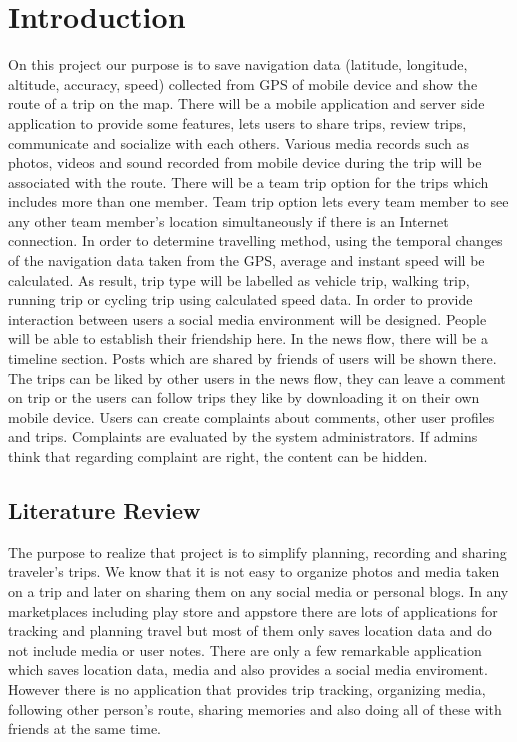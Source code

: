 \chapter{Introduction}
On this project our purpose is to save navigation data (latitude, longitude, altitude, accuracy, speed) collected from GPS of mobile device and show the route of a trip on the map. There will be a mobile application and server side application to provide some features, lets users to share trips, review trips, communicate and socialize with each others. Various media records such as photos, videos and sound recorded from mobile device during the trip will be associated with the route. There will be a team trip option for the trips which includes more than one member. Team trip option lets every team member to see any other team member's location simultaneously if there is an Internet connection. In order to determine travelling method, using the temporal changes of the navigation data taken from the GPS, average and instant speed will be calculated. As result, trip type will be labelled as vehicle trip, walking trip, running trip or cycling trip using calculated speed data. In order to provide interaction between users a social media environment will be designed. People will be able to establish their friendship here. In the news flow, there will be a timeline section. Posts which are shared by friends of users will be shown there. The trips can be liked by other users in the news flow, they can leave a comment on trip or the users can follow trips they like by downloading it on their own mobile device. Users can create complaints about comments, other user profiles and trips. Complaints are evaluated by the system administrators. If admins think that regarding complaint are right, the content can be hidden.
\section{Literature Review}
The purpose to realize that project is to simplify planning, recording and sharing traveler's trips. We know that it is not easy to organize photos and media taken on a trip and later on sharing them on any social media or personal blogs. In any marketplaces including play store and appstore there are lots of applications for tracking and planning travel but most of them only saves location data and do not include media or user notes. There are only a few remarkable application which saves location data, media and also provides a social media enviroment. However there is no application that provides trip tracking, organizing media, following other person's route, sharing memories and also doing all of these with friends at the same time. 

